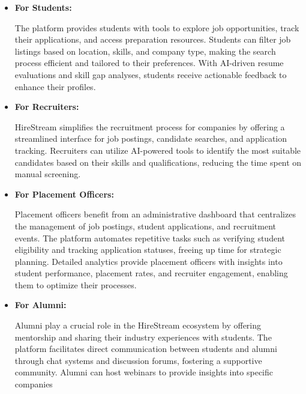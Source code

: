 \documentclass[a4paper, 12pt]{report}
\begin{document}
\begin{itemize}[itemsep=-4pt]
 \item\textbf{For Students:} 
 
 The platform provides students with tools to explore job opportunities, track their applications, and access preparation resources. Students can filter job listings based on location, skills, and company type, making the search process efficient and tailored to their preferences. With AI-driven resume evaluations and skill gap analyses, students receive actionable feedback to enhance their profiles.
 \newpage

\item\textbf{For Recruiters:}

 HireStream simplifies the recruitment process for companies by offering a streamlined interface for job postings, candidate searches, and application tracking. Recruiters can utilize AI-powered tools to identify the most suitable candidates based on their skills and qualifications, reducing the time spent on manual screening.

\item\textbf{For Placement Officers:}

 Placement officers benefit from an administrative dashboard that centralizes the management of job postings, student applications, and recruitment events. The platform automates repetitive tasks such as verifying student eligibility and tracking application statuses, freeing up time for strategic planning. Detailed analytics provide placement officers with insights into student performance, placement rates, and recruiter engagement, enabling them to optimize their processes.

\item\textbf{For Alumni:}

 Alumni play a crucial role in the HireStream ecosystem by offering mentorship and sharing their industry experiences with students. The platform facilitates direct communication between students and alumni through chat systems and discussion forums, fostering a supportive community. Alumni can host webinars to provide insights into specific companies
\end{itemize}
\end{document}
